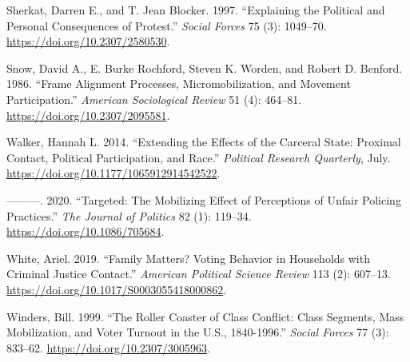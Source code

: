 \documentclass[
  12pt,
]{article}
\newlength{\cslhangindent}
\newenvironment{cslreferences}%
  {\setlength{\parindent}{0pt}%
  \everypar{\setlength{\hangindent}{\cslhangindent}}\ignorespaces}%
  {\par}
\begin{document}
\begin{cslreferences}
\leavevmode\hypertarget{ref-Sherkat1997}{}%
Sherkat, Darren E., and T. Jean Blocker. 1997. ``Explaining the Political and Personal Consequences of Protest.'' \emph{Social Forces} 75 (3): 1049--70. \url{https://doi.org/10.2307/2580530}.

\leavevmode\hypertarget{ref-Snow1986}{}%
Snow, David A., E. Burke Rochford, Steven K. Worden, and Robert D. Benford. 1986. ``Frame Alignment Processes, Micromobilization, and Movement Participation.'' \emph{American Sociological Review} 51 (4): 464--81. \url{https://doi.org/10.2307/2095581}.

\leavevmode\hypertarget{ref-Walker2014}{}%
Walker, Hannah L. 2014. ``Extending the Effects of the Carceral State: Proximal Contact, Political Participation, and Race.'' \emph{Political Research Quarterly}, July. \url{https://doi.org/10.1177/1065912914542522}.

\leavevmode\hypertarget{ref-Walker2020}{}%
---------. 2020. ``Targeted: The Mobilizing Effect of Perceptions of Unfair Policing Practices.'' \emph{The Journal of Politics} 82 (1): 119--34. \url{https://doi.org/10.1086/705684}.

\leavevmode\hypertarget{ref-White2019}{}%
White, Ariel. 2019. ``Family Matters? Voting Behavior in Households with Criminal Justice Contact.'' \emph{American Political Science Review} 113 (2): 607--13. \url{https://doi.org/10.1017/S0003055418000862}.

\leavevmode\hypertarget{ref-Winders1999}{}%
Winders, Bill. 1999. ``The Roller Coaster of Class Conflict: Class Segments, Mass Mobilization, and Voter Turnout in the U.S., 1840-1996.'' \emph{Social Forces} 77 (3): 833--62. \url{https://doi.org/10.2307/3005963}.
\end{cslreferences}
\end{document}
